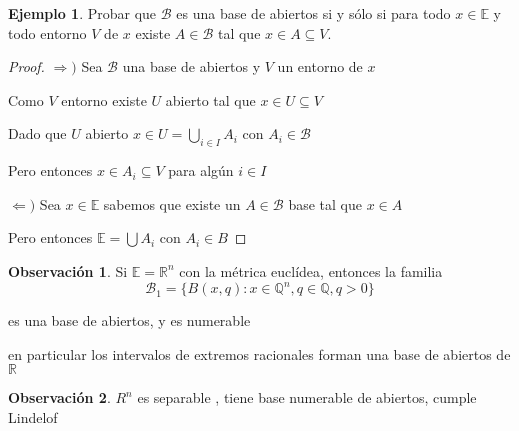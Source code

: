 \documentclass[12pt]{article}
\newcommand{\Q}{\mathbb{Q}}
\newcommand{\R}{\mathbb{R}}
\newcommand{\E}{\mathbb{E}}
\newcommand{\Ra}{\Rightarrow}
\theoremstyle{definition}
\newtheorem*{remark}{Observación}
\newtheorem{ex}{Ejemplo}
\begin{document}
\begin{ex}
  Probar que $\mathcal{B}$ es una base de abiertos si y sólo si para todo $x \in \E$ y todo entorno $V$ de $x$ existe $A \in \mathcal{B}$ tal que $x \in A \subseteq V.$
  \begin{proof}
  $\Ra )$ Sea $\mathcal{B}$ una base de abiertos y $V$ un entorno de $x$

    Como $V$ entorno existe $U$ abierto tal que $x \in U \subseteq V$

    Dado que $U$ abierto $x \in U = \bigcup_{i \in I} A_i$ con $A_i \in \mathcal B$

    Pero entonces $x \in A_i \subseteq V$ para algún $i \in I$

  $\Leftarrow )$ Sea $x \in \E$ sabemos que existe un $A \in \mathcal{B}$ base tal que $x \in A$
  
  Pero entonces $\E = \bigcup A_i$ con $A_i \in B$
  \end{proof}
\end{ex}
\begin{remark}
  Si $\E = \R^n$ con la métrica euclídea, entonces la familia
$$ \mathcal{B}_1 = \{B(x,q): x \in \Q^n, q \in \Q, q >0\}$$

es una base de abiertos, y es numerable

en particular los intervalos de extremos racionales forman una base de abiertos de $\R$
\end{remark}
\begin{remark}
  $R^n$ es separable , tiene base numerable de abiertos, cumple Lindelof 
\end{remark}
\end{document}
